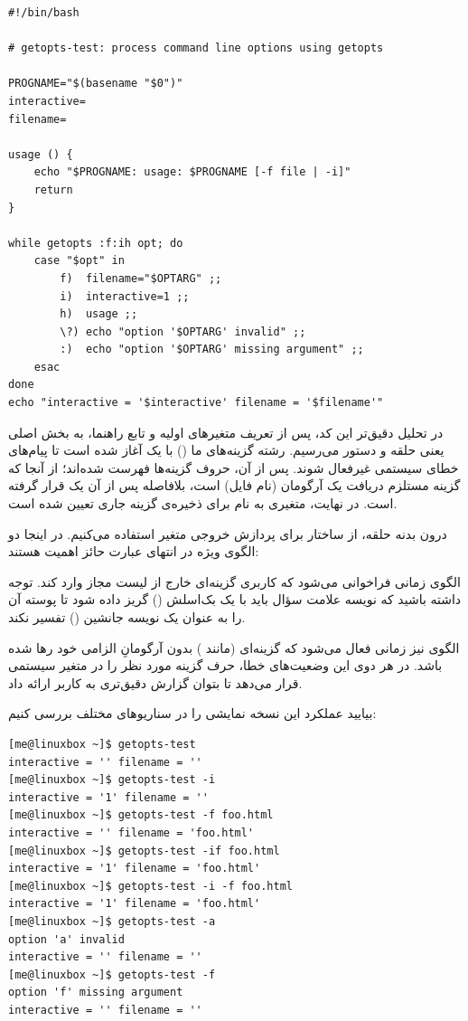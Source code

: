 \begin{latin}
\begin{lstlisting}
#!/bin/bash

# getopts-test: process command line options using getopts

PROGNAME="$(basename "$0")"
interactive=
filename=

usage () {
    echo "$PROGNAME: usage: $PROGNAME [-f file | -i]"
    return
}

while getopts :f:ih opt; do
    case "$opt" in
        f)  filename="$OPTARG" ;;
        i)  interactive=1 ;;
        h)  usage ;;
        \?) echo "option '$OPTARG' invalid" ;;
        :)  echo "option '$OPTARG' missing argument" ;;
    esac
done
echo "interactive = '$interactive' filename = '$filename'"
\end{lstlisting}
\end{latin}

در تحلیل دقیق‌تر این کد، پس از تعریف متغیرهای اولیه و تابع راهنما، به بخش اصلی یعنی حلقه  و دستور  می‌رسیم. رشته گزینه‌های ما () با یک \cmd{:} آغاز شده است تا پیام‌های خطای سیستمی غیرفعال شوند. پس از آن، حروف گزینه‌ها فهرست شده‌اند؛ از آنجا که گزینه  مستلزم دریافت یک آرگومان (نام فایل) است، بلافاصله پس از آن یک \cmd{:} قرار گرفته است. در نهایت، متغیری به نام  برای ذخیره‌ی گزینه جاری تعیین شده است.

درون بدنه حلقه، از ساختار  برای پردازش خروجی متغیر  استفاده می‌کنیم. در اینجا دو الگوی ویژه در انتهای عبارت  حائز اهمیت هستند:

الگوی  زمانی فراخوانی می‌شود که کاربری گزینه‌ای خارج از لیست مجاز وارد کند. توجه داشته باشید که نویسه علامت سؤال باید با یک بک‌اسلش (\cmd{\textbackslash}) گریز داده شود تا پوسته آن را به عنوان یک نویسه جانشین () تفسیر نکند.

الگوی \cmd{:} نیز زمانی فعال می‌شود که گزینه‌ای (مانند ) بدون آرگومانِ الزامی خود رها شده باشد. در هر دوی این وضعیت‌های خطا،  حرف گزینه مورد نظر را در متغیر سیستمی  قرار می‌دهد تا بتوان گزارش دقیق‌تری به کاربر ارائه داد.

بیایید عملکرد این نسخه نمایشی را در سناریوهای مختلف بررسی کنیم:

\begin{latin}
\begin{lstlisting}
[me@linuxbox ~]$ getopts-test
interactive = '' filename = ''
[me@linuxbox ~]$ getopts-test -i
interactive = '1' filename = ''
[me@linuxbox ~]$ getopts-test -f foo.html
interactive = '' filename = 'foo.html'
[me@linuxbox ~]$ getopts-test -if foo.html
interactive = '1' filename = 'foo.html'
[me@linuxbox ~]$ getopts-test -i -f foo.html
interactive = '1' filename = 'foo.html'
[me@linuxbox ~]$ getopts-test -a
option 'a' invalid
interactive = '' filename = ''
[me@linuxbox ~]$ getopts-test -f
option 'f' missing argument
interactive = '' filename = ''
\end{lstlisting}
\end{latin}

